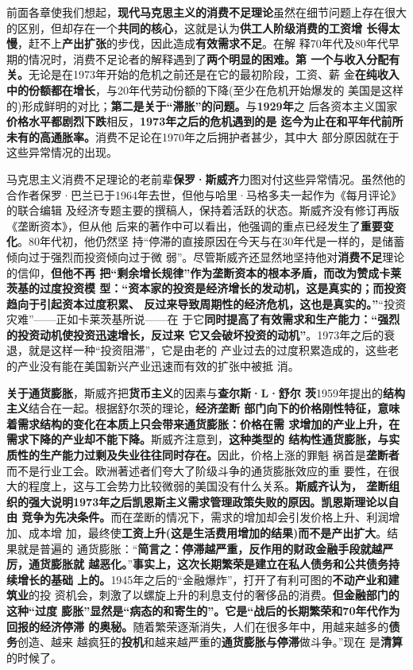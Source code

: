 前面各章使我们想起，\textbf{现代马克思主义的消费不足理论}虽然在细节问题上存在很大
的区别，但却存在一个\textbf{共同的核心}，这就是认为\textbf{供工人阶级消费的工资增
  长得太慢}，赶不上\textbf{产出扩张}的步伐，因此造成\textbf{有效需求不足}。在解
释70年代及80年代早期的情况时，消费不足论者的解释遇到了\textbf{两个明显的困难。第
  一个与收入分配有关。}无论是在1973年开始的危机之前还是在它的最初阶段，工资、薪
金\textbf{在纯收入中的份额都在增长}，与20年代劳动份额的下降(至少在危机开始爆发的
美国是这样的)形成鲜明的对比；\textbf{第二是关于“滞胀”的问题。}与\textbf{1929年}之
后各资本主义国家\textbf{价格水平都剧烈下跌}相反，\textbf{1973年之后的危机遇到的是
  迄今为止在和平年代前所未有的高通胀率。}消费不足论在1970年之后拥护者甚少，其中大
部分原因就在于这些异常情况的出现。

马克思主义消费不足理论的老前辈\textbf{保罗·斯威齐}力图对付这些异常情况。虽然他的
合作者保罗·巴兰已于1964年去世，但他与哈里·马格多夫一起作为《每月评论》的联合编辑
及经济专题主要的撰稿人，保持着活跃的状态。斯威齐没有修订再版《垄断资本》，但从他
后来的著作中可以看出，他强调的重点已经发生了\textbf{重要变化}。80年代初，他仍然坚
持“停滞的直接原因在今天与在30年代是一样的，是储蓄倾向过于强烈而投资倾向过于微
弱”。尽管斯威齐还显然地坚持他对\textbf{消费不足}理论的信仰，\textbf{但他不再
  把“剩余增长规律”作为垄断资本的根本矛盾，而改为赞成卡莱茨基的过度投资模
  型：“资本家的投资是经济增长的发动机，这是真实的；而投资趋向于引起资本过度积累、
  反过来导致周期性的经济危机，这也是真实的。”}“投资灾难”——正如卡莱茨基所说——在
于它\textbf{同时提高了有效需求和生产能力：“强烈的投资动机使投资迅速增长，反过来
  它又会破坏投资的动机”}。1973年之后的衰退，就是这样一种“投资阻滞”，它是由老的
产业过去的过度积累造成的，这些老的产业没有能在美国新兴产业迅速而有效的扩张中被抵
消。

\textbf{关于通货膨胀}，斯威齐把\textbf{货币主义}的因素与\textbf{查尔斯·L·舒尔
  茨}1959年提出的\textbf{结构主义}结合在一起。根据舒尔茨的理论，\textbf{经济垄断
  部门向下的价格刚性特征，意味着需求结构的变化在本质上只会带来通货膨胀：价格在需
  求增加的产业上升，在需求下降的产业却不能下降。}斯威齐注意到，\textbf{这种类型的
  结构性通货膨胀，与实质性的生产能力过剩及失业往往同时存在。}因此，价格上涨的罪魁
祸首是\textbf{垄断者}而不是行业工会。欧洲著述者们夸大了阶级斗争的通货膨胀效应的重
要性，在很大的程度上，这与工会势力比较微弱的美国没有什么关系。\textbf{斯威齐认为，
  垄断组织的强大说明1973年之后凯恩斯主义需求管理政策失败的原因。凯恩斯理论以自由
  竞争为先决条件。}而在垄断的情况下，需求的增加却会引发价格上升、利润增加、成本增
加，最终使\textbf{工资上升(这是生活费用增加的结果)而不是产出扩大}。结果就是普遍的
通货膨胀：“\textbf{简言之：停滞越严重，反作用的财政金融手段就越严厉，通货膨胀就
  越恶化。}”\textbf{事实上，这次长期繁荣是建立在私人债务和公共债务持续增长的基础
  上的。}1945年之后的“金融爆炸”，打开了有利可图的\textbf{不动产业和建筑业}的投
资机会，刺激了以螺旋上升的利息支付的奢侈品的消费。\textbf{但金融部门的这种“过度
  膨胀”显然是“病态的和寄生的”。它是“战后的长期繁荣和70年代作为回报的经济停滞
  的奥秘。}随着繁荣逐渐消失，人们在很多年中，用越来越多的\textbf{债务}创造、越来
越疯狂的\textbf{投机}和越来越严重的\textbf{通货膨胀与停滞}做斗争。”现在
是\textbf{清算}的时候了。

